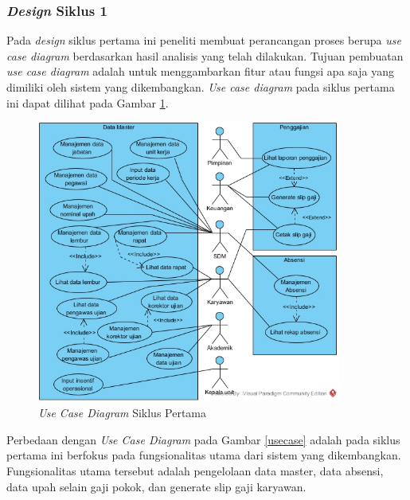 	\subsubsection{\emph{Design} Siklus 1}
	Pada \emph{design} siklus pertama ini peneliti membuat perancangan proses berupa \emph{use case diagram} berdasarkan hasil analisis yang telah dilakukan. Tujuan pembuatan \emph{use case diagram} adalah untuk menggambarkan fitur atau fungsi apa saja yang dimiliki oleh sistem yang dikembangkan. \emph{Use case diagram} pada siklus pertama ini dapat dilihat pada Gambar \ref{use_case_pertama}.
	\begin{figure}[H]
	    \centering            		    \includegraphics[width=10cm]{gambar/use-case-pertama}
	    \caption{\emph{Use Case Diagram} Siklus Pertama}
	    \label{use_case_pertama}
	\end{figure}
	Perbedaan dengan \emph{Use Case Diagram} pada Gambar \ref{usecase} adalah pada siklus pertama ini berfokus pada fungsionalitas utama dari sistem yang dikembangkan. Fungsionalitas utama tersebut adalah pengelolaan data master, data absensi, data upah selain gaji pokok, dan generate slip gaji karyawan.
	
